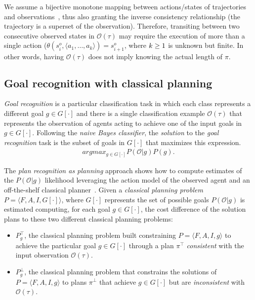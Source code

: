 \documentclass{article}
\newcommand{\tup}[1]{{\langle #1 \rangle}}
\begin{document}
We assume a bijective monotone mapping between actions/states of trajectories and observations~\cite{ramirez2009plan}, thus also granting the inverse consistency relationship (the trajectory is a superset of the observation). Therefore, transiting between two consecutive observed states in $\mathcal{O}(\tau)$ may require the execution of more than a single action ($\theta(s_i^o,\tup{a_1,\ldots,a_k})=s_{i+1}^o$, where ${\small k\geq 1}$ is unknown but finite. In other words, having $\mathcal{O}(\tau)$ does not imply knowing the actual length of $\pi$.

\subsection{Goal recognition with classical planning}
{\em Goal recognition} is a particular classification task in which each class represents a different goal $g\in G[\cdot]$ and there is a single classification example $\mathcal{O}(\tau)$ that represents the observation of agents acting to achieve one of the input goals in $g\in G[\cdot]$. Following the {\em naive Bayes classifier}, the {\em solution} to the {\em goal recognition} task is the subset of goals in $G[\cdot]$ that maximizes this expression.
\begin{align}
argmax_{g\in G[\cdot]} P(\mathcal{O}|g) P(g).
\end{align}

The {\em plan recognition as planning} approach shows how to compute estimates of the $P(\mathcal{O}|g)$ likelihood leveraging the action model of the observed agent and an off-the-shelf classical planner~\cite{ramirez2012plan}. Given a {\em classical planning problem} $P=\tup{F,A,I,G[\cdot]}$, where $G[\cdot]$ represents the set of possible goals $P(\mathcal{O}|g)$ is estimated computing, for each goal $g\in G[\cdot]$, the cost difference of the solution plans to these two different classical planning problems:
\begin{itemize}
\item $P^{\top}_g$, the classical planning problem built constraining $P=\tup{F,A,I,g}$ to achieve the particular goal $g\in G[\cdot]$ through a plan $\pi^\top$ {\em consistent} with the input observation $\mathcal{O}(\tau)$.
\item $P^{\bot}_g$, the classical planning problem that constrains the solutions of $P=\tup{F,A,I,g}$ to plans $\pi^\bot$ that achieve $g\in G[\cdot]$ but are {\em inconsistent} with $\mathcal{O}(\tau)$.
\end{itemize}
\end{document}
